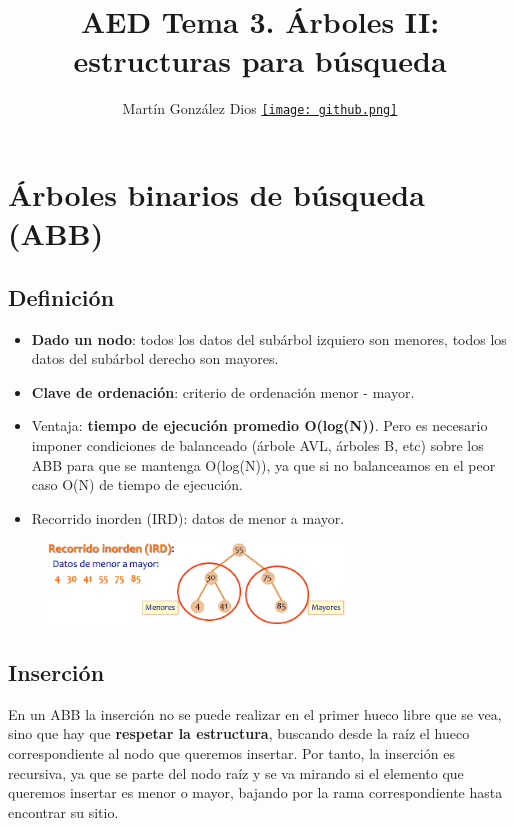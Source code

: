 \documentclass{article}
\title{AED Tema 3. Árboles II: estructuras para búsqueda}
\author{Martín González Dios 
\href{https://github.com/martindios}{\texttt{[image: github.png]}}}
\begin{document}
\maketitle

\section{Árboles binarios de búsqueda (ABB)}
\subsection{Definición}
\begin{itemize}
    \item \textbf{Dado un nodo}: todos los datos del subárbol izquiero son menores, todos los datos del subárbol derecho son mayores.

    \item \textbf{Clave de ordenación}: criterio de ordenación menor - mayor.

    \item Ventaja: \textbf{tiempo de ejecución promedio O(log(N))}. Pero es necesario imponer condiciones de balanceado (árbole AVL, árboles B, etc) sobre los ABB para que se mantenga O(log(N)), ya que si no balanceamos en el peor caso O(N) de tiempo de ejecución.

    \item Recorrido inorden (IRD): datos de menor a mayor.
\end{itemize}

\begin{figure}[h]
    \centering
    \includegraphics[width=0.7\textwidth]{img-t3/img_193_37.png}
\end{figure}

\subsection{Inserción}
En un ABB la inserción no se puede realizar en el primer hueco libre que se vea, sino que hay que \textbf{respetar la estructura}, buscando desde la raíz el hueco correspondiente al nodo que queremos insertar. Por tanto, la inserción es recursiva, ya que se parte del nodo raíz y se va mirando si el elemento que queremos insertar es menor o mayor, bajando por la rama correspondiente hasta encontrar su sitio. \\
\end{document}
